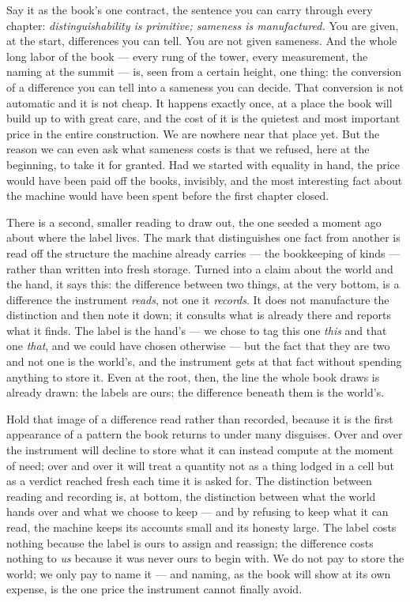 Say it as the book's one contract, the sentence you can carry through every chapter: \emph{distinguishability is
primitive; sameness is manufactured.} You are given, at the start, differences you can tell. You are not given
sameness. And the whole long labor of the book --- every rung of the tower, every measurement, the naming at the
summit --- is, seen from a certain height, one thing: the conversion of a difference you can tell into a sameness
you can decide. That conversion is not automatic and it is not cheap. It happens exactly once, at a place the
book will build up to with great care, and the cost of it is the quietest and most important price in the entire
construction. We are nowhere near that place yet. But the reason we can even ask what sameness costs is that we
refused, here at the beginning, to take it for granted. Had we started with equality in hand, the price would
have been paid off the books, invisibly, and the most interesting fact about the machine would have been spent
before the first chapter closed.

There is a second, smaller reading to draw out, the one seeded a moment ago about where the label lives. The mark
that distinguishes one fact from another is read off the structure the machine already carries --- the
bookkeeping of kinds --- rather than written into fresh storage. Turned into a claim about the world and the
hand, it says this: the difference between two things, at the very bottom, is a difference the instrument
\emph{reads}, not one it \emph{records}. It does not manufacture the distinction and then note it down; it
consults what is already there and reports what it finds. The label is the hand's --- we chose to tag this one
\emph{this} and that one \emph{that}, and we could have chosen otherwise --- but the fact that they are two and
not one is the world's, and the instrument gets at that fact without spending anything to store it. Even at the
root, then, the line the whole book draws is already drawn: the labels are ours; the difference beneath them is
the world's.

Hold that image of a difference read rather than recorded, because it is the first appearance of a pattern the
book returns to under many disguises. Over and over the instrument will decline to store what it can instead
compute at the moment of need; over and over it will treat a quantity not as a thing lodged in a cell but as a
verdict reached fresh each time it is asked for. The distinction between reading and recording is, at bottom, the
distinction between what the world hands over and what we choose to keep --- and by refusing to keep what it can
read, the machine keeps its accounts small and its honesty large. The label costs nothing because the label is
ours to assign and reassign; the difference costs nothing to \emph{us} because it was never ours to begin with.
We do not pay to store the world; we only pay to name it --- and naming, as the book will show at its own
expense, is the one price the instrument cannot finally avoid.

